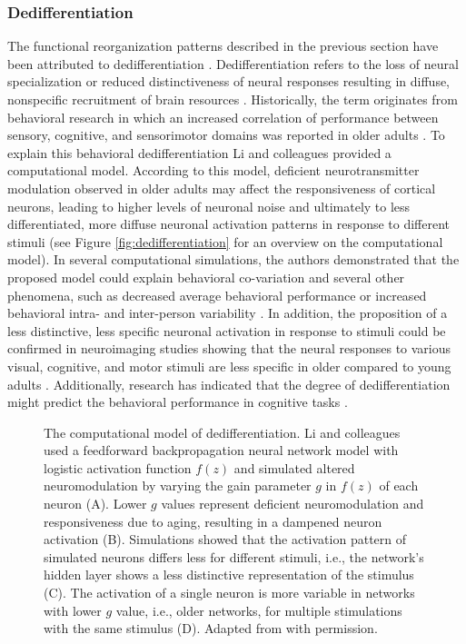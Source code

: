 \subsubsection{Dedifferentiation}
\label{theory:aging:dedif}
The functional reorganization patterns described in the previous section have been attributed to dedifferentiation \cite{Grady2012}. Dedifferentiation refers to the loss of neural specialization or reduced distinctiveness of neural responses resulting in diffuse, nonspecific recruitment of brain resources \cite{Koen2019}. Historically, the term originates from behavioral research in which an increased correlation of performance between sensory, cognitive, and sensorimotor domains was reported in older adults \cite{Baltes1997,Li2002}. To explain this behavioral dedifferentiation Li and colleagues \cite{Li2001, Li2002} provided a computational model. According to this model, deficient neurotransmitter modulation observed in older adults may affect the responsiveness of cortical neurons, leading to higher levels of neuronal noise and ultimately to less differentiated, more diffuse neuronal activation patterns in response to different stimuli \cite{Li2001,Li2002} (see Figure \autoref{fig:dedifferentiation} for an overview on the computational model). In several computational simulations, the authors demonstrated that the proposed model could explain behavioral co-variation and several other phenomena, such as decreased average behavioral performance or increased behavioral intra- and inter-person variability \cite{Li2000,Li2002}. In addition, the proposition of a less distinctive, less specific neuronal activation in response to stimuli could be confirmed in neuroimaging studies showing that the neural responses to various visual, cognitive, and motor stimuli are less specific in older compared to young adults \cite{Tucker2019, Koen2019,Carb2011}. Additionally, research has indicated that the degree of dedifferentiation might predict the behavioral performance in cognitive tasks \cite{Koen2019}.

\begin{figure}[h]
\def\svgwidth{\columnwidth}

\caption[The computational model of dedifferentiation.]{The computational model of dedifferentiation. Li and colleagues \cite{Li2001,Li2002} used a feedforward backpropagation neural network model with logistic activation function $f(z)$ and simulated altered neuromodulation by varying the gain parameter $g$ in $f(z)$ of each neuron (A). Lower $g$ values represent deficient neuromodulation and responsiveness due to aging, resulting in a dampened neuron activation (B). Simulations showed that the activation pattern of simulated neurons differs less for different stimuli, i.e., the network's hidden layer shows a less distinctive representation of the stimulus (C). The activation of a single neuron is more variable in networks with lower $g$ value, i.e., older networks, for multiple stimulations with the same stimulus (D). Adapted from \citeauthor{Li2001} \cite{Li2001} with permission.}
\label{fig:dedifferentiation}
\end{figure}

